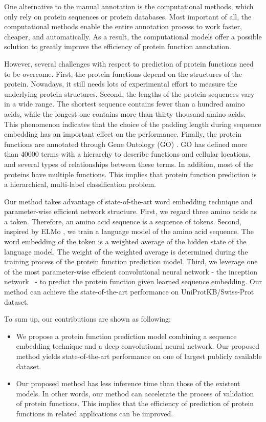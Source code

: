 \documentclass{article}
\begin{document}
	One alternative to the manual annotation is the computational methods, which only rely on protein sequences or protein databases. Most important of all, the computational methods enable the entire annotation process to work faster, cheaper, and automatically. As a result, the computational models offer a possible solution to greatly improve the efficiency of protein function annotation.\par

	However, several challenges with respect to prediction of protein functions need to be overcome. First, the protein functions depend on the structures of the protein. Nowadays, it still needs lots of experimental effort to measure the underlying protein structures. Second, the lengths of the protein sequences vary in a wide range. The shortest sequence contains fewer than a hundred amino acids, while the longest one contains more than thirty thousand amino acids. This phenomenon indicates that the choice of the padding length during sequence embedding has an important effect on the performance. Finally, the protein functions are annotated through Gene Ontology (GO) \citep{Ashburner2000,doi:10.1093/nar/gkw1108}. GO has defined more than 40000 terms with a hierarchy to describe functions and cellular locations, and several types of relationships between these terms. In addition, most of the proteins have multiple functions. This implies that protein function prediction is a hierarchical, multi-label classification problem. \par

    Our method takes advantage of state-of-the-art word embedding technique and parameter-wise efficient network structure. First, we regard three amino acids as a token. Therefore, an amino acid sequence is a sequence of tokens. Second, inspired by ELMo \citep{Peters:2018}, we train a language model of the amino acid sequence. The word embedding of the token is a weighted average of the hidden state of the language model. The weight of the weighted average is determined during the training process of the protein function prediction model. Third, we leverage one of the most parameter-wise efficient convolutional neural network - the inception network~\citep{szegedy2015going} - to predict the protein function given learned sequence embedding. Our method can achieve the state-of-the-art performance on UniProtKB/Swiss-Prot dataset. \par
    To sum up, our contributions are shown as following:
    
    \begin{itemize}
        \item We propose a protein function prediction model combining a sequence embedding technique and a deep convolutional neural network. Our proposed method yields state-of-the-art performance on one of largest publicly available dataset.
        \item Our proposed method has less inference time than those of the existent models. In other words, our method can accelerate the process of validation of protein functions. This implies that the efficiency of prediction of protein functions in related applications can be improved.
    \end{itemize}
\end{document}
